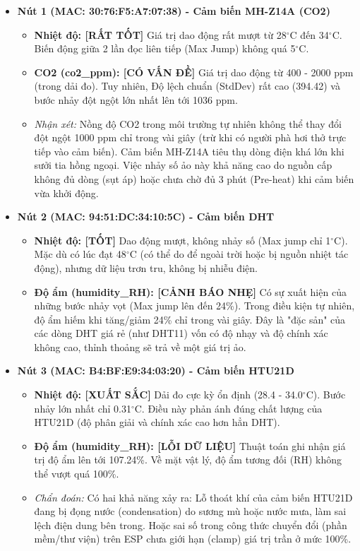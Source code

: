 \documentclass{article} %
\begin{document}
\begin{itemize}
    \item \textbf{Nút 1 (MAC: 30:76:F5:A7:07:38) - Cảm biến MH-Z14A (CO2)}
    \begin{itemize}
        \item \textbf{Nhiệt độ: [RẤT TỐT]} Giá trị dao động rất mượt từ 28$^\circ$C đến 34$^\circ$C. Biến động giữa 2 lần đọc liên tiếp (Max Jump) không quá 5$^\circ$C.
        \item \textbf{CO2 (co2\_ppm): [CÓ VẤN ĐỀ]} Giá trị dao động từ 400 - 2000 ppm (trong dải đo). Tuy nhiên, Độ lệch chuẩn (StdDev) rất cao (394.42) và bước nhảy đột ngột lớn nhất lên tới 1036 ppm.
        \item \textit{Nhận xét:} Nồng độ CO2 trong môi trường tự nhiên không thể thay đổi đột ngột 1000 ppm chỉ trong vài giây (trừ khi có người phà hơi thở trực tiếp vào cảm biến). Cảm biến MH-Z14A tiêu thụ dòng điện khá lớn khi sưởi tia hồng ngoại. Việc nhảy số ảo này khả năng cao do nguồn cấp không đủ dòng (sụt áp) hoặc chưa chờ đủ 3 phút (Pre-heat) khi cảm biến vừa khởi động.
    \end{itemize}
    
    \item \textbf{Nút 2 (MAC: 94:51:DC:34:10:5C) - Cảm biến DHT}
    \begin{itemize}
        \item \textbf{Nhiệt độ: [TỐT]} Dao động mượt, không nhảy số (Max jump chỉ 1$^\circ$C). Mặc dù có lúc đạt 48$^\circ$C (có thể do để ngoài trời hoặc bị nguồn nhiệt tác động), nhưng dữ liệu trơn tru, không bị nhiễu điện.
        \item \textbf{Độ ẩm (humidity\_RH): [CẢNH BÁO NHẸ]} Có sự xuất hiện của những bước nhảy vọt (Max jump lên đến 24\%). Trong điều kiện tự nhiên, độ ẩm hiếm khi tăng/giảm 24\% chỉ trong vài giây. Đây là "đặc sản" của các dòng DHT giá rẻ (như DHT11) vốn có độ nhạy và độ chính xác không cao, thỉnh thoảng sẽ trả về một giá trị ảo.
    \end{itemize}
    
    \item \textbf{Nút 3 (MAC: B4:BF:E9:34:03:20) - Cảm biến HTU21D}
    \begin{itemize}
        \item \textbf{Nhiệt độ: [XUẤT SẮC]} Dải đo cực kỳ ổn định (28.4 - 34.0$^\circ$C). Bước nhảy lớn nhất chỉ 0.31$^\circ$C. Điều này phản ánh đúng chất lượng của HTU21D (độ phân giải và chính xác cao hơn hẳn DHT).
        \item \textbf{Độ ẩm (humidity\_RH): [LỖI DỮ LIỆU]} Thuật toán ghi nhận giá trị độ ẩm lên tới 107.24\%. Về mặt vật lý, độ ẩm tương đối (RH) không thể vượt quá 100\%.
        \item \textit{Chẩn đoán:} Có hai khả năng xảy ra: Lỗ thoát khí của cảm biến HTU21D đang bị đọng nước (condensation) do sương mù hoặc nước mưa, làm sai lệch điện dung bên trong. Hoặc sai số trong công thức chuyển đổi (phần mềm/thư viện) trên ESP chưa giới hạn (clamp) giá trị trần ở mức 100\%.
    \end{itemize}
\end{itemize}
\end{document}
